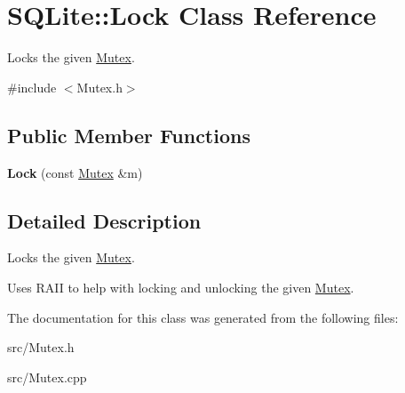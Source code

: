 \hypertarget{class_s_q_lite_1_1_lock}{\section{S\-Q\-Lite\-:\-:Lock Class Reference}
\label{class_s_q_lite_1_1_lock}
}


Locks the given \hyperlink{class_s_q_lite_1_1_mutex}{Mutex}.  




{\ttfamily \#include $<$Mutex.\-h$>$}

\subsection*{Public Member Functions}
\begin{DoxyCompactItemize}
\item 
\hypertarget{class_s_q_lite_1_1_lock_ad7c333c305ff20ce19959ef2b0d8a6b7}{{\bfseries Lock} (const \hyperlink{class_s_q_lite_1_1_mutex}{Mutex} \&m)}\label{class_s_q_lite_1_1_lock_ad7c333c305ff20ce19959ef2b0d8a6b7}

\end{DoxyCompactItemize}


\subsection{Detailed Description}
Locks the given \hyperlink{class_s_q_lite_1_1_mutex}{Mutex}. 

Uses R\-A\-I\-I to help with locking and unlocking the given \hyperlink{class_s_q_lite_1_1_mutex}{Mutex}. 

The documentation for this class was generated from the following files\-:\begin{DoxyCompactItemize}
\item 
src/Mutex.\-h\item 
src/Mutex.\-cpp\end{DoxyCompactItemize}
